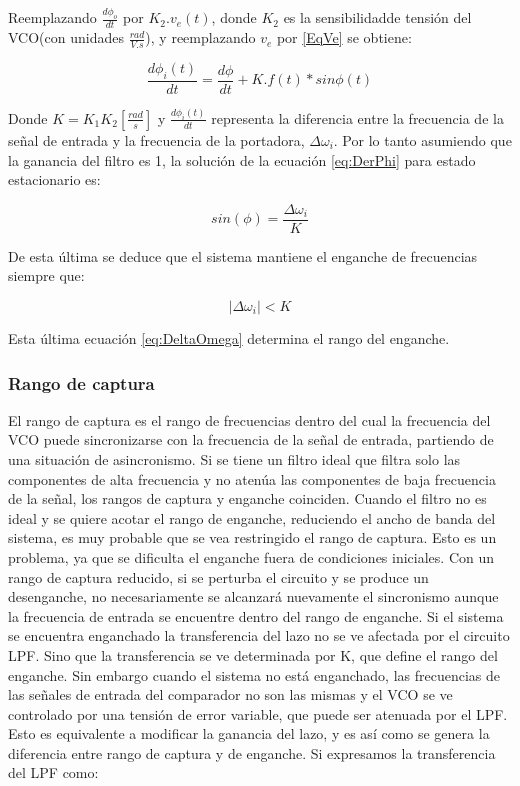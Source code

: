 Reemplazando $\frac{d\phi_o}{dt}$ por $K_2.v_e(t)$, donde $K_2$ es la sensibilidadde tensión del VCO(con unidades $\frac{rad}{V.s}$), y reemplazando $v_e$ por \ref{EqVe} se obtiene:

\begin{equation}
	\frac{d\phi_i(t)}{dt} = \frac{d\phi}{dt} +K.f(t)*sin\phi(t)
	\label{eq:DerPhi}
\end{equation}

Donde $K = K_1 K_2 [\frac{rad}{s}]$ y $\frac{d\phi_i(t)}{dt}$ representa la diferencia entre la frecuencia de la señal de entrada y la frecuencia de la portadora, $\Delta\omega_i$. Por lo tanto asumiendo que la ganancia del filtro es 1, la solución de la ecuación \ref{eq:DerPhi} para estado estacionario es:

\begin{equation}
	sin(\phi) = \frac{\Delta\omega_i}{K}
	\label{eq:SinPhi}
\end{equation}

De esta última se deduce que el sistema mantiene el enganche de frecuencias siempre que:

\begin{equation}
	|\Delta\omega_i|< K
	\label{eq:DeltaOmega}
\end{equation}

Esta última ecuación \ref{eq:DeltaOmega} determina el rango del enganche.

\subsubsection{Rango de captura}
El rango de captura es el rango de frecuencias dentro del cual la frecuencia del VCO puede sincronizarse con la
frecuencia de la señal de entrada, partiendo de una situación de asincronismo. Si se tiene un filtro ideal que filtra solo las componentes de alta frecuencia y no atenúa las componentes de baja frecuencia de la señal, los rangos de captura y enganche coinciden. Cuando el filtro no es ideal y se quiere acotar el rango de enganche, reduciendo el ancho de banda del sistema, es muy probable que se vea restringido el rango de captura. Esto es un problema, ya que se dificulta el enganche fuera de condiciones iniciales. Con un rango de captura reducido, si se perturba el circuito y se produce un desenganche, no necesariamente se alcanzará nuevamente el sincronismo aunque la frecuencia de entrada se encuentre dentro del rango de enganche.
Si el sistema se encuentra enganchado la transferencia del lazo no se ve afectada por el circuito LPF. Sino que la transferencia se ve determinada por K, que define el rango del enganche. Sin embargo cuando el sistema no está enganchado, las frecuencias de las señales de entrada del comparador no son las mismas y el VCO se ve controlado por una tensión de error variable, que puede ser atenuada por el LPF. Esto es equivalente a modificar la ganancia del lazo, y es así como se genera la diferencia entre rango de captura y de enganche. Si expresamos la transferencia del LPF como:


